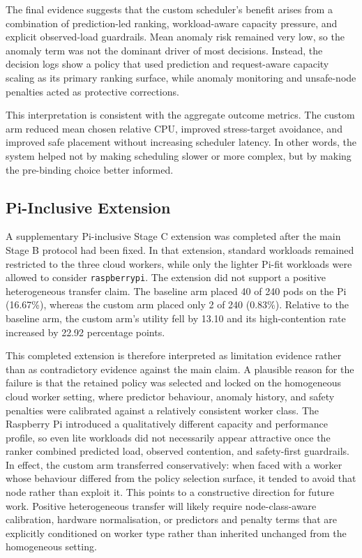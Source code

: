 The final evidence suggests that the custom scheduler's benefit arises from a combination of prediction-led ranking, workload-aware capacity pressure, and explicit observed-load guardrails. Mean anomaly risk remained very low, so the anomaly term was not the dominant driver of most decisions. Instead, the decision logs show a policy that used prediction and request-aware capacity scaling as its primary ranking surface, while anomaly monitoring and unsafe-node penalties acted as protective corrections.

This interpretation is consistent with the aggregate outcome metrics. The custom arm reduced mean chosen relative CPU, improved stress-target avoidance, and improved safe placement without increasing scheduler latency. In other words, the system helped not by making scheduling slower or more complex, but by making the pre-binding choice better informed.


\subsection{Pi-Inclusive Extension}

A supplementary Pi-inclusive Stage C extension was completed after the main Stage B protocol had been fixed. In that extension, standard workloads remained restricted to the three cloud workers, while only the lighter Pi-fit workloads were allowed to consider \texttt{raspberrypi}. The extension did not support a positive heterogeneous transfer claim. The baseline arm placed 40 of 240 pods on the Pi (16.67\%), whereas the custom arm placed only 2 of 240 (0.83\%). Relative to the baseline arm, the custom arm's utility fell by 13.10 and its high-contention rate increased by 22.92 percentage points.

This completed extension is therefore interpreted as limitation evidence rather than as contradictory evidence against the main claim. A plausible reason for the failure is that the retained policy was selected and locked on the homogeneous cloud worker setting, where predictor behaviour, anomaly history, and safety penalties were calibrated against a relatively consistent worker class. The Raspberry Pi introduced a qualitatively different capacity and performance profile, so even lite workloads did not necessarily appear attractive once the ranker combined predicted load, observed contention, and safety-first guardrails. In effect, the custom arm transferred conservatively: when faced with a worker whose behaviour differed from the policy selection surface, it tended to avoid that node rather than exploit it. This points to a constructive direction for future work. Positive heterogeneous transfer will likely require node-class-aware calibration, hardware normalisation, or predictors and penalty terms that are explicitly conditioned on worker type rather than inherited unchanged from the homogeneous setting.


